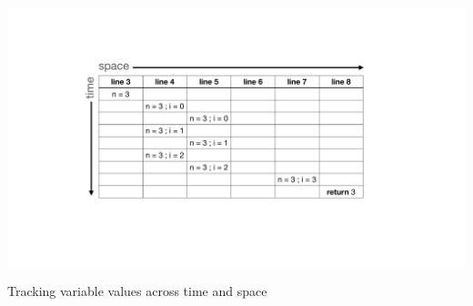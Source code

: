 \documentclass[english,submission]{programming}
\begin{document}
\begin{table}[t]
  \centering
  \includegraphics[width=\textwidth]{img/matrix.pdf}
  \caption{Tracking variable values across time and space}
\end{table}
\end{document}
